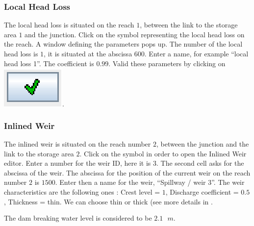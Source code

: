 \documentclass[a4paper,12pt]{article}
\begin{document}
\subsubsection{Local Head Loss }

\hspace{0.5cm}The local head loss is situated on the reach $1$, between the link to
the storage area $1$ and the junction. Click on the symbol representing
the local head loss on the reach. A window defining the parameters
pops up. The number of the local head loss is $1$, it is situated at
the abscissa $600$. Enter a name, for example {}``local head loss 1''.
The coefficient is $0.99$. Valid these parameters by clicking on \includegraphics[scale=0.6]{valid}.


\subsubsection{Inlined Weir  }

\hspace{0.5cm}The inlined weir is situated on the reach number $2$, between the junction
and the link to the storage area $2$. Click on the symbol in order to
open the Inlined Weir editor. Enter a number for the weir ID, here
it is $3$. The second cell asks for the abscissa of the weir. The abscissa
for the position of the current weir on the reach number $2$ is $1500$.
Enter then a name for the weir, {}``Spillway / weir 3''. The weir
characteristics are the following ones : Crest level = $1$, Discharge
coefficient = $0.5$, Thickness = thin. We can choose thin or thick (see more details in \cite{GOUTAL96}. 

\vspace{0.5cm}

The dam breaking water level is considered to be $2.1\mbox{ }m$.
\end{document}
